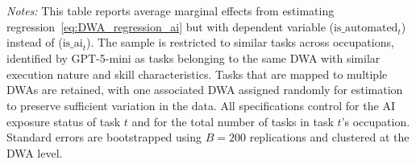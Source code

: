 \newpage
\begin{table}[ht!]
\begin{center}
\caption{Effect of Neighboring Tasks' AI Execution Status on Task's AI Automation Likelihood (GPT-filtered Sample)}
\label{tab:DWA_regression_aiAutomation_GPTsample}
\resizebox{\textwidth}{!}{

}
\end{center}
\footnotesize{\emph{Notes:}} 
This table reports average marginal effects from estimating regression~\eqref{eq:DWA_regression_ai} but with dependent variable ($\text{is\_automated}_{t}$) instead of ($\text{is\_ai}_{t}$).
The sample is restricted to similar tasks across occupations, identified by GPT-5-mini as tasks belonging to the same DWA with similar execution nature and skill characteristics.
Tasks that are mapped to multiple DWAs are retained, with one associated DWA assigned randomly for estimation to preserve sufficient variation in the data.  
All specifications control for the AI exposure status of task $t$ and for the total number of tasks in task $t$'s occupation.
Standard errors are bootstrapped using $B=200$ replications and clustered at the DWA level.  
\end{table}